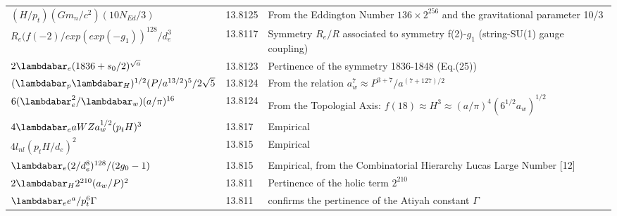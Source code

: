 \documentclass[a4paper,9pt]{article}
\begin{document}
\begin{table}
\begin{tabular}{lll}
 
 
 
 $ (H/p_t)(Gm_n/c^2) (10N_{Ed}/3)$ & 13.8125 & From the Eddington Number $136 \times 2^{256}$ and the gravitational parameter 10/3 \cite{Sanchez3}  \\
 
 
 $ R_e ({f(-2)}/exp(exp(-g_1))^{128}/d_e^3$  & 13.8117    & Symmetry $R_e/R$ associated to symmetry f(2)-$g_1$  (string-SU(1) gauge coupling)     \\
 
 
 
 



 $ 2\lambdabar_{e} (1836+s_0/2)^{\sqrt a} $  & 13.8123 & Pertinence of the symmetry 1836-1848 (Eq.(25))\\

  
  $ (\lambdabar_{p} \lambdabar_{H})^{1/2} (P/a^{13/2})^5/2\sqrt 5 $  & 13.8124 & From the relation $a_w^7 \approx P^{3+7}/a^{(7 + 127)/2}$ \cite{Sanchez3}\\
 
  
  $6(\lambdabar_{e}^2/\lambdabar_w)(a/\pi)^{16}$  & 13.8124    & From the Topologial Axis: $f(18)\approx H^3 \approx (a/\pi)^4 (6^{1/2}a_w)^{1/2}$  \\
  
  
  
   
  $4\lambdabar_e a WZ a_w^{1/2} (p_tH)^3$  & 13.817    & Empirical \\
  
  $4l_{nl} (p_tH/d_e)^2$  & 13.815    & Empirical \\
  
 $\lambdabar_e (2/d_e^8)^{128}/(2g_0-1)$  & 13.815    &  Empirical, from the Combinatorial Hierarchy Lucas Large Number [12] \\ 
  
  
  $ 2\lambdabar_{H}2^{210} (a_w/P)^2  $ & 13.811 & Pertinence of the holic term $2^{210}$ \\
  
  $ \lambdabar_e e^a/p_t^6\Gamma$ & 13.811 & confirms the pertinence of the Atiyah constant $\Gamma$  \\
  
  
  
  
  
 
  

\end{tabular}
\end{table}
\end{document}
